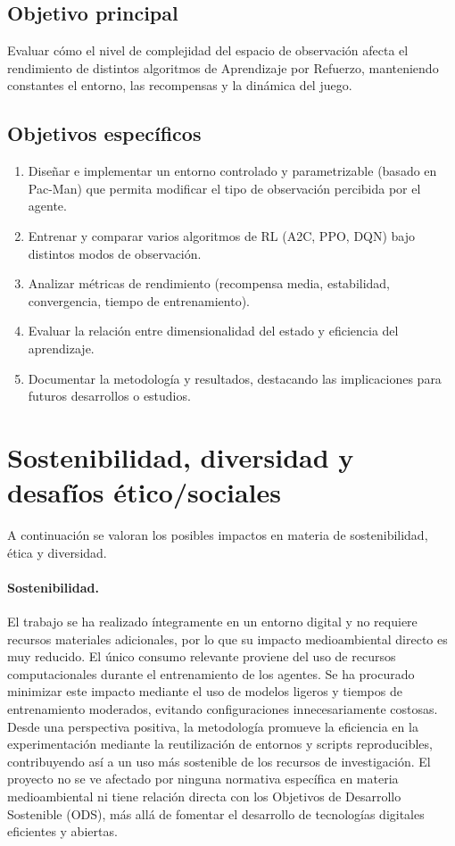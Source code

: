 \subsection{Objetivo principal}

Evaluar cómo el nivel de complejidad del espacio de observación afecta el rendimiento de distintos algoritmos de Aprendizaje por Refuerzo, manteniendo constantes el entorno, las recompensas y la dinámica del juego.

\subsection{Objetivos específicos}

\begin{enumerate}
    \item Diseñar e implementar un entorno controlado y parametrizable (basado en Pac-Man) que permita modificar el tipo de observación percibida por el agente.
    \item Entrenar y comparar varios algoritmos de RL (A2C, PPO, DQN) bajo distintos modos de observación.
    \item Analizar métricas de rendimiento (recompensa media, estabilidad, convergencia, tiempo de entrenamiento).
    \item Evaluar la relación entre dimensionalidad del estado y eficiencia del aprendizaje.
    \item Documentar la metodología y resultados, destacando las implicaciones para futuros desarrollos o estudios.
\end{enumerate}

\section{Sostenibilidad, diversidad y desafíos ético/sociales}

A continuación se valoran los posibles impactos en materia de sostenibilidad, ética y diversidad.

\paragraph{Sostenibilidad.}
El trabajo se ha realizado íntegramente en un entorno digital y no requiere recursos materiales adicionales, por lo que su impacto medioambiental directo es muy reducido. El único consumo relevante proviene del uso de recursos computacionales durante el entrenamiento de los agentes. Se ha procurado minimizar este impacto mediante el uso de modelos ligeros y tiempos de entrenamiento moderados, evitando configuraciones innecesariamente costosas. Desde una perspectiva positiva, la metodología promueve la eficiencia en la experimentación mediante la reutilización de entornos y scripts reproducibles, contribuyendo así a un uso más sostenible de los recursos de investigación. El proyecto no se ve afectado por ninguna normativa específica en materia medioambiental ni tiene relación directa con los Objetivos de Desarrollo Sostenible (ODS), más allá de fomentar el desarrollo de tecnologías digitales eficientes y abiertas.

